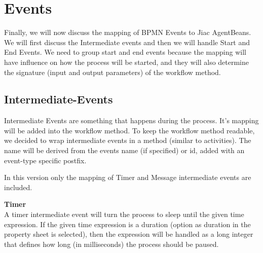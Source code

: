 \section{Events}
Finally, we will now discuss the mapping of BPMN Events to Jiac AgentBeans. We will first discuss the Intermediate events and then we will handle Start and End Events. We need to group start and end events because the mapping will have influence on how the process will be started, and they will also determine the signature (input and output parameters) of the workflow method. 

\subsection{Intermediate-Events}
Intermediate Events are something that happens during the process. It's mapping will be added into the workflow method. To keep the workflow method readable, we decided to wrap intermediate events in a method (similar to activities). The name will be derived from the events name (if specified) or id, added with an event-type specific postfix.

In this version only the mapping of Timer and Message intermediate events are included. 

\textbf{Timer}\\
A timer intermediate event will turn the process to sleep until the given time expression. If the given time expression is a duration (option as duration in the property sheet is selected), then the expression will be handled as a long integer that defines how long (in milliseconds) the process should be paused.\\


